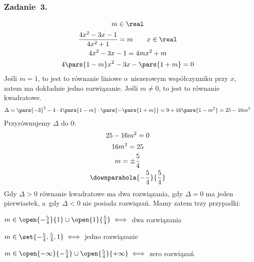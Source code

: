 \subsubsection*{Zadanie~3.}
\begin{gather*}
    m \in \real\\
    \frac{4x^2 - 3x - 1}{4x^2 + 1} = m \qquad x \in \real\\
    4x^2 - 3x - 1 = 4mx^2 + m\\
    4\pars{1 - m}x^2 - 3x - \pars{1 + m} = 0\\
\end{gather*}
Jeśli \(m = 1\), to jest to równanie liniowe o~niezerowym współczynniku przy \(x\), zatem ma dokładnie jedno rozwiązanie. Jeśli \(m \neq 0\), to jest to równanie kwadratowe.
\begin{gather*}
    \Delta
        = \pars{-3}^2 - 4 \cdot 4\pars{1 - m} \cdot \pars{-\pars{1 + m}}
        = 9 + 16\pars{1 - m^2}
        = 25 - 16m^2
\end{gather*}
Przyrównujemy \(\Delta\) do \(0\):
\begin{gather*}
    25 - 16m^2 = 0\\
    16 m^2 = 25\\
    m = \pm\frac{5}{4}\\
    \downparabola{-\frac{5}{4}}{\frac{5}{4}}
\end{gather*}
Gdy \(\Delta > 0\) równanie kwadratowe ma dwa rozwiązania, gdy \(\Delta = 0\) ma jeden pierwiastek, a~gdy \(\Delta < 0\) nie posiada rozwiązań. Mamy zatem trzy przypadki:
\begin{description}
    \item \(m \in \open{-\frac{5}{4}}{1} \cup \open{1}{\frac{5}{4}} \iff\) dwa rozwiązania
    \item \(m \in \set{-\frac{5}{4}, \frac{5}{4}, 1} \iff\) jedno rozwiązanie
    \item \(m \in \open{-\infty}{-\frac{5}{4}} \cup \open{\frac{5}{4}}{+\infty} \iff\) zero rozwiązań
\end{description}
